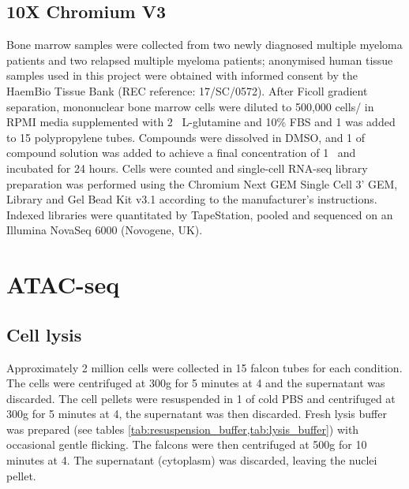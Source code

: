 \subsection{10X Chromium V3}
Bone marrow samples were collected from two newly diagnosed multiple myeloma patients and two relapsed multiple myeloma patients;
anonymised human tissue samples used in this project were obtained with informed consent by the HaemBio Tissue Bank (REC reference: 17/SC/0572).
After Ficoll gradient separation, mononuclear bone marrow cells were diluted to 500,000 cells/\ml{} in RPMI media supplemented with 2\si{\milli\Molar}
L-glutamine and 10\% FBS and 1\ml{} was added to 15\ml{} polypropylene tubes.
Compounds were dissolved in DMSO, and 1\ul{} of compound solution was added to achieve a final concentration of 1\si{\micro\Molar} and incubated for 24 hours.
Cells were counted and single-cell RNA-seq library preparation was performed using the Chromium Next GEM Single Cell 3' GEM, Library and Gel Bead Kit v3.1 according to the manufacturer's instructions.
Indexed libraries were quantitated by TapeStation, pooled and sequenced on an Illumina NovaSeq 6000 (Novogene, UK).


\section{ATAC-seq}\label{sec:methods_atac}

\subsection{Cell lysis}
Approximately 2 million cells were collected in 15\ml{} falcon tubes for each condition.
The cells were centrifuged at 300g for 5 minutes at 4\C{} and the supernatant was discarded.
The cell pellets were resuspended in 1\ml{} of cold PBS and centrifuged at 300g for 5 minutes at 4{\C}, the supernatant was then discarded.
Fresh lysis buffer was prepared (see tables \ref{tab:resuspension_buffer,tab:lysis_buffer}) with occasional gentle flicking.
The falcons were then centrifuged at 500g for 10 minutes at 4\C{}.
The supernatant (cytoplasm) was discarded, leaving the nuclei pellet.


